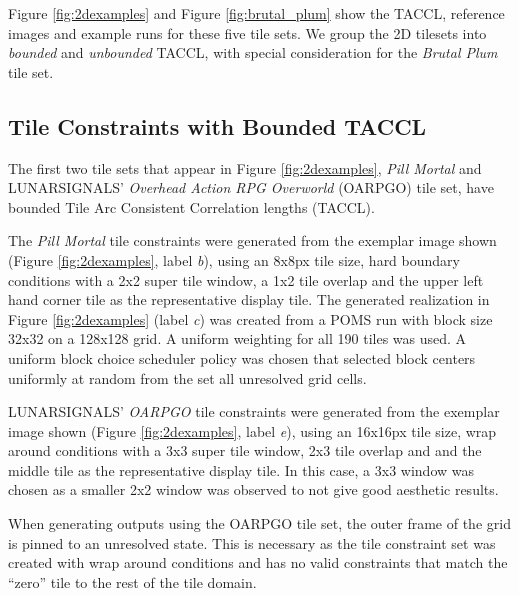 Figure \ref{fig:2dexamples} and Figure \ref{fig:brutal_plum} show the TACCL, reference images and example runs
for these five tile sets.
We group the 2D tilesets into \textit{bounded} and \textit{unbounded} TACCL, with special consideration for
the \textit{Brutal Plum} tile set.




\subsection{Tile Constraints with Bounded TACCL}

The first two tile sets that appear in Figure \ref{fig:2dexamples}, \textit{Pill Mortal} and LUNARSIGNALS' \textit{Overhead Action RPG Overworld}
(OARPGO) tile set,
have bounded Tile Arc Consistent Correlation lengths (TACCL).

The \textit{Pill Mortal} tile constraints were generated from the exemplar image shown (Figure \ref{fig:2dexamples}, label \textit{b}), using
an 8x8px tile size, hard boundary conditions with a 2x2 super tile window, a 1x2 tile overlap and the upper left hand corner tile as the representative
display tile.
The generated realization in Figure \ref{fig:2dexamples} (label \textit{c}) was created from a POMS run with block size 32x32 on a 128x128 grid.
A uniform weighting for all 190 tiles was used.
A uniform block choice scheduler policy was chosen that selected block centers uniformly at random from the set all unresolved grid cells.

LUNARSIGNALS' \textit{OARPGO} tile constraints were generated from the exemplar image shown (Figure \ref{fig:2dexamples}, label \textit{e}), using
an 16x16px tile size, wrap around conditions with a 3x3 super tile window, 2x3 tile overlap and and the middle tile as the representative
display tile.
In this case, a 3x3 window was chosen as a smaller 2x2 window was observed to not give good aesthetic results.

When generating outputs using the OARPGO tile set, the outer frame of the grid is pinned to an unresolved state.
This is necessary as the tile constraint set was created with wrap around conditions and has no valid constraints that match the ``zero'' tile
to the rest of the tile domain.

